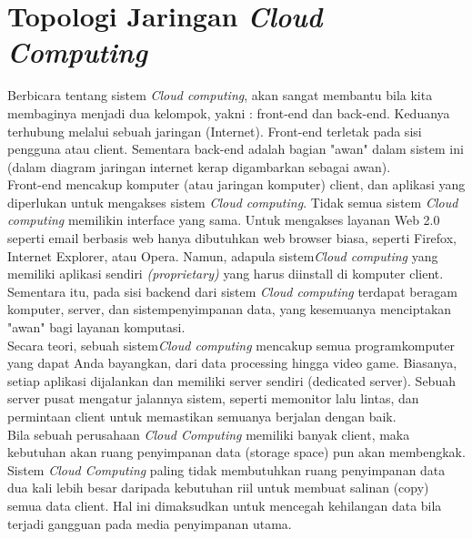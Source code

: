 \date{}
\section{Topologi Jaringan \textit{Cloud Computing}}
Berbicara tentang sistem \textit{Cloud computing}, akan sangat membantu bila kita membaginya menjadi dua kelompok, yakni : front-end dan back-end. Keduanya terhubung melalui sebuah jaringan (Internet). Front-end terletak pada sisi pengguna atau client. Sementara back-end adalah bagian "awan" dalam sistem ini (dalam diagram jaringan internet kerap digambarkan sebagai awan).\\
\tab Front-end mencakup komputer (atau jaringan komputer) client, dan aplikasi yang diperlukan untuk mengakses sistem \textit{Cloud computing}. Tidak semua sistem \textit{Cloud computing} memilikin interface yang sama. Untuk mengakses layanan Web 2.0 seperti email berbasis web hanya dibutuhkan web browser biasa, seperti Firefox, Internet Explorer, atau  Opera.
Namun, adapula sistem\textit{Cloud computing} yang memiliki aplikasi sendiri \textit{(proprietary)} yang harus diinstall di komputer client. Sementara itu, pada sisi backend dari sistem \textit{Cloud computing} terdapat beragam komputer, server, dan sistempenyimpanan data, yang kesemuanya menciptakan "awan" bagi layanan komputasi.
\\
\tab Secara teori, sebuah sistem\textit{Cloud computing} mencakup semua programkomputer yang dapat Anda bayangkan, dari data processing hingga video game. Biasanya, setiap aplikasi dijalankan dan memiliki server sendiri (dedicated server). Sebuah server pusat mengatur jalannya sistem, seperti memonitor lalu lintas, dan permintaan client untuk memastikan semuanya berjalan dengan baik.\\
Bila sebuah perusahaan \textit{Cloud Computing} memiliki banyak client, maka kebutuhan akan ruang penyimpanan data (storage space) pun akan membengkak. Sistem \textit{Cloud Computing} paling tidak membutuhkan ruang penyimpanan data dua kali lebih besar daripada kebutuhan riil untuk membuat salinan (copy) semua data client. Hal ini dimaksudkan untuk mencegah kehilangan data bila terjadi gangguan pada media penyimpanan utama.\\

